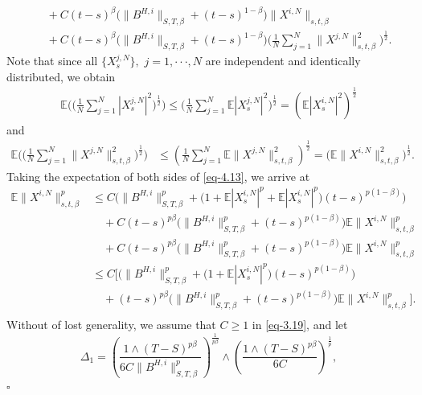 \documentclass[12pt]{article}
\def\E{\mathbb E}
\newenvironment{proof}{{\noindent\it Proof.}\ }{\hfill $\square$\par}
\numberwithin{equation}{section}
\begin{document}
\begin{proof}
\begin{equation}
\begin{aligned}
				&\quad+C(t-s)^{\beta}\Big(\|B^{H,i}\|_{S,T,\beta}+(t-s)^{1-\beta}\Big)\|X^{i,N}\|_{s,t,\beta}\\
				&\quad+C(t-s)^{\beta}\Big(\|B^{H,i}\|_{S,T,\beta}+(t-s)^{1-\beta}\Big)\bigg(\frac{1}{N}\sum_{j=1}^N\|X^{j,N}\|^2_{s,t,\beta}\bigg)^{\frac{1}{2}}.
			\end{aligned}
		\end{equation}
		Note that since all $\{X^{j,N}_s\},$ $j=1,\cdot\cdot\cdot,N$ are independent and identically distributed, we obtain
		\begin{align*}
			\E\bigg(\bigg(\frac{1}{N}\sum_{j=1}^N|X^{j,N}_s|^2\bigg)^{\frac{1}{2}}\bigg)\leq \bigg(\frac{1}{N}\sum_{j=1}^N\E|X^{j,N}_s|^2\bigg)^{\frac{1}{2}}=(\E|X^{i,N}_s|^2)^{\frac{1}{2}}
		\end{align*}
		and
		\begin{equation}
			\begin{aligned}
				\mathbb{E}\bigg(\bigg(\frac{1}{N}\sum_{j=1}^{N}\|X^{j,N}\|_{s,t,\beta}^{2}\bigg)^{\frac{1}{2}}\bigg)& \leq\left(\frac{1}{N}\sum_{j=1}^{N}\E\|X^{j,N}\|_{s,t,\beta}^{2}\right)^{\frac{1}{2}} =\big(\mathbb{E}\|X^{i,N}\|_{s,t,\beta}^{2}\big)^{\frac{1}{2}}.
			\end{aligned}
		\end{equation}
		Taking the expectation of both sides of \eqref{eq-4.13},  we arrive at
		\begin{equation}\label{eq-3.19}
			\begin{aligned}
				\E\|X^{i,N}\|^p_{s,t,\beta}&\leq C\Big(\|B^{H,i}\|^p_{S,T,\beta}+\big(1+\E|X^{i,N}_s|^p+\E|X^{i,N}_s|^p\big)(t-s)^{p(1-\beta)}\Big)\\
				&\quad+C(t-s)^{p\beta}\Big(\|B^{H,i}\|^p_{S,T,\beta}+(t-s)^{p(1-\beta)}\Big)\E\|X^{i,N}\|^p_{s,t,\beta}\\
				&\quad+C(t-s)^{p\beta}\Big(\|B^{H,i}\|^p_{S,T,\beta}+(t-s)^{p(1-\beta)}\Big)\E\|X^{i,N}\|^p_{s,t,\beta}\\
				&\leq C\Big[\Big(\|B^{H,i}\|^p_{S,T,\beta}+\big(1+\E|X^{i,N}_s|^p\big)(t-s)^{p(1-\beta)}\Big)\\
				&\quad+(t-s)^{p\beta}\Big(\|B^{H,i}\|^p_{S,T,\beta}+(t-s)^{p(1-\beta)}\Big)\E\|X^{i,N}\|^p_{s,t,\beta}\Big].\\
			\end{aligned}
		\end{equation}	
		Without of lost generality, we assume that $C \geq 1$ in \eqref{eq-3.19}, and let
		\begin{equation}\label{eq-4.15}
			\Delta_1 = \left( \frac{1 \wedge (T-S)^{p\beta}}{6 C \| B^{H,i} \|^p _{S, T, \beta}} \right)^{\frac{1}{p\beta}} \wedge \left(\frac{1\wedge(T-S)^{p\beta}}{6C}\right)^\frac{1}{p}{},

\end{equation}
\end{proof}
\end{document}
